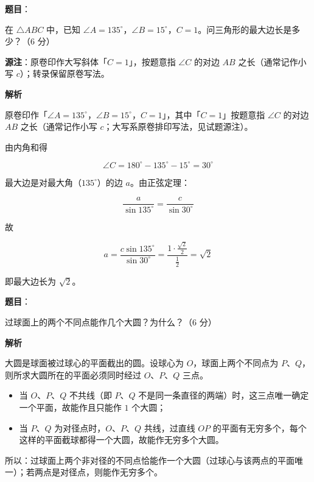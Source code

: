 \begin{answer}

\textbf{题目}：

在 $\triangle ABC$ 中，已知 $\angle A=135^\circ$，$\angle B=15^\circ$，$C=1$。问三角形的最大边长是多少？（6 分）

\begin{gktip}
\textbf{源注}：原卷印作大写斜体「$C=1$」，按题意指 $\angle C$ 的对边 $AB$ 之长（通常记作小写 $c$）；转录保留原卷写法。
\end{gktip}

\textbf{解析}

原卷印作「$\angle A=135^\circ$，$\angle B=15^\circ$，$C=1$」，其中「$C=1$」按题意指 $\angle C$ 的对边 $AB$ 之长（通常记作小写 $c$；大写系原卷排印写法，见试题源注）。

由内角和得

\nopagebreak[4]
\[
\angle C=180^\circ-135^\circ-15^\circ=30^\circ
\]

最大边是对最大角（$135^\circ$）的边 $a$。由正弦定理：

\nopagebreak[4]
\[
\frac{a}{\sin 135^\circ}=\frac{c}{\sin 30^\circ}
\]

故

\nopagebreak[4]
\[
a=\frac{c\sin 135^\circ}{\sin 30^\circ}=\frac{1\cdot\frac{\sqrt{2}}{2}}{\frac{1}{2}}=\sqrt{2}
\]

即最大边长为 $\sqrt{2}$。


\end{answer}
\begin{answer}

\textbf{题目}：

过球面上的两个不同点能作几个大圆？为什么？（6 分）

\textbf{解析}

大圆是球面被过球心的平面截出的圆。设球心为 $O$，球面上两个不同点为 $P$、$Q$，则所求大圆所在的平面必须同时经过 $O$、$P$、$Q$ 三点。

\begin{itemize}
\item 当 $O$、$P$、$Q$ 不共线（即 $P$、$Q$ 不是同一条直径的两端）时，这三点唯一确定一个平面，故能作且只能作 $1$ 个大圆；
\item 当 $P$、$Q$ 为对径点时，$O$、$P$、$Q$ 共线，过直线 $OP$ 的平面有无穷多个，每个这样的平面截球都得一个大圆，故能作无穷多个大圆。
\end{itemize}

所以：过球面上两个非对径的不同点恰能作一个大圆（过球心与该两点的平面唯一）；若两点是对径点，则能作无穷多个。


\end{answer}
